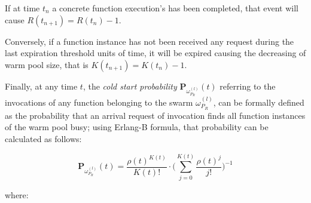 \documentclass[12pt,a4paper]{report}
\begin{document}
If at time $t_n$ a concrete function execution's has been completed, that event will cause $R(t_{n+1}) = R(t_n) - 1$. 

Conversely, if a function instance has not been received any request during the last expiration threshold units of time, it will be expired causing the decreasing of warm pool size, that is $K(t_{n+1}) = K(t_n) - 1$.

Finally, at any time $t$, the \textit{cold start probability} $\textbf{P}_{\omega_{P_R}^{(l)}}(t)$ referring to the invocations of any function belonging to the swarm $\omega_{P_R}^{(l)}$, can be formally defined as the probability that an arrival request of invocation finds all function instances of the warm pool busy; using Erlang-B formula, that probability can be calculated as follows:

\begin{equation}
	\displaystyle \textbf{P}_{\omega_{P_R}^{(l)}}(t) = \dfrac{\rho(t)^{K(t)}}{K(t)!} \cdot \Bigg( \displaystyle\sum_{j=0}^{K(t)} \dfrac{\rho(t)^j}{j!}\Bigg)^{-1}
\end{equation}

where:
\end{document}
